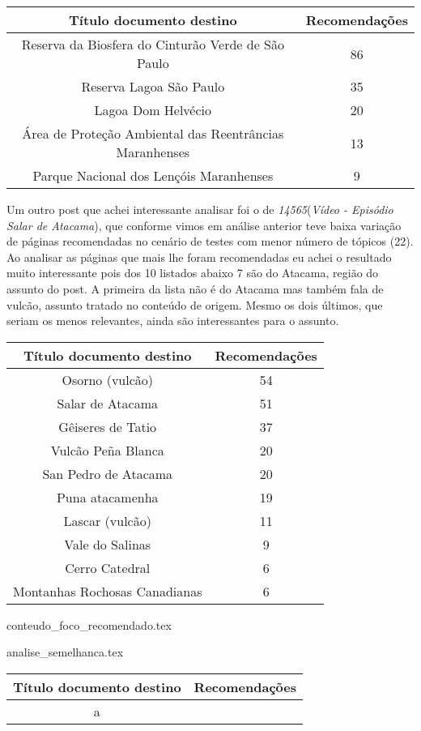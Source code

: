 \begin{center}
    \begin{tabular}{|c|c|}
        \hline
        \textbf{Título documento destino} & \textbf{Recomendações} \\
        \hline
        Reserva da Biosfera do Cinturão Verde de São Paulo & 86 \\
        \hline
        Reserva Lagoa São Paulo & 35 \\
        \hline
        Lagoa Dom Helvécio & 20 \\
        \hline
        Área de Proteção Ambiental das Reentrâncias Maranhenses & 13 \\
        \hline
        Parque Nacional dos Lençóis Maranhenses & 9 \\
        \hline
    \end{tabular}
\end{center}

Um outro post que achei interessante analisar foi o de \textit{14565}(\textit{Vídeo - Episódio Salar de Atacama}), que conforme vimos em análise 
anterior teve baixa variação de páginas recomendadas no cenário de testes com menor número de tópicos (22). Ao analisar as páginas que mais lhe foram
recomendadas eu achei o resultado muito interessante pois dos 10 listados abaixo 7 são do Atacama, região do assunto do post. A primeira da lista
não é do Atacama mas também fala de vulcão, assunto tratado no conteúdo de origem. Mesmo os dois últimos, que seriam os menos relevantes, ainda 
são interessantes para o assunto.

\begin{center}
    \begin{tabular}{|c|c|}
        \hline
        \textbf{Título documento destino} & \textbf{Recomendações} \\
        \hline
        Osorno (vulcão) & 54 \\
        \hline
        Salar de Atacama & 51 \\
        \hline
        Gêiseres de Tatio & 37 \\
        \hline
        Vulcão Peña Blanca & 20 \\
        \hline
        San Pedro de Atacama & 20 \\
        \hline
        Puna atacamenha & 19 \\
        \hline
        Lascar (vulcão) & 11 \\
        \hline
        Vale do Salinas & 9 \\
        \hline
        Cerro Catedral & 6 \\
        \hline
        Montanhas Rochosas Canadianas & 6 \\
        \hline
    \end{tabular}
\end{center}

{conteudo_foco_recomendado.tex}

{analise_semelhanca.tex}

\begin{center}
    \begin{tabular}{|c|c|}
        \hline
        \textbf{Título documento destino} & \textbf{Recomendações} \\
        \hline
        a \\
        \hline
    \end{tabular}
\end{center}